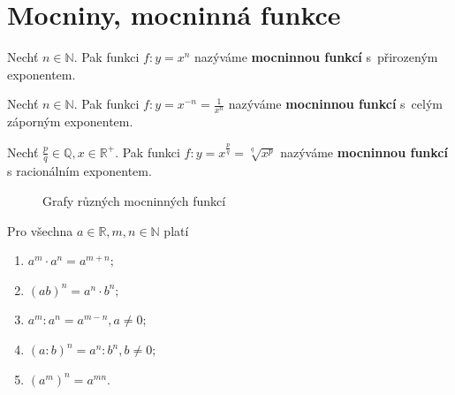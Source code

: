 \section{Mocniny, mocninná funkce}

\begin{definition}
    Nechť $n\in \mathbb N.$ Pak funkci $f\colon y=x^n$ nazýváme \textbf{mocninnou funkcí}
    s~přirozeným exponentem.
\end{definition}

\begin{definition}
    Nechť $n\in \mathbb N.$ Pak funkci $f\colon y=x^{-n}=\frac{1}{x^n}$ nazýváme
    \textbf{mocninnou funkcí} s~celým záporným exponentem.
\end{definition}

\begin{definition}
    Nechť $\frac{p}{q}\in \mathbb Q, x \in \mathbb R^+.$ Pak funkci $f\colon y=
    x^{\frac{p}{q}}=\sqrt[q]{x^p}$ nazýváme \textbf{mocninnou funkcí}
    s racionálním exponentem.
\end{definition}


\begin{figure}[ht!]
  \centering
  \caption{Grafy různých mocninných funkcí}
\end{figure}

\begin{veta}
    Pro všechna $a \in \mathbb R, m,n \in \mathbb N$ platí
    \begin{enumerate}[$i.$]
        \item $a^m\cdot a^n=a^{m+n};$
       	\item $(ab)^n = a^n\cdot b^n;$
       	\item $a^m : a^n = a^{m-n}, a \ne 0;$
       	\item $(a : b)^n = a^n : b^n, b \ne 0;$
       	\item $\left ( a^m \right )^n = a^{mn}.$
    \end{enumerate}
\end{veta}

